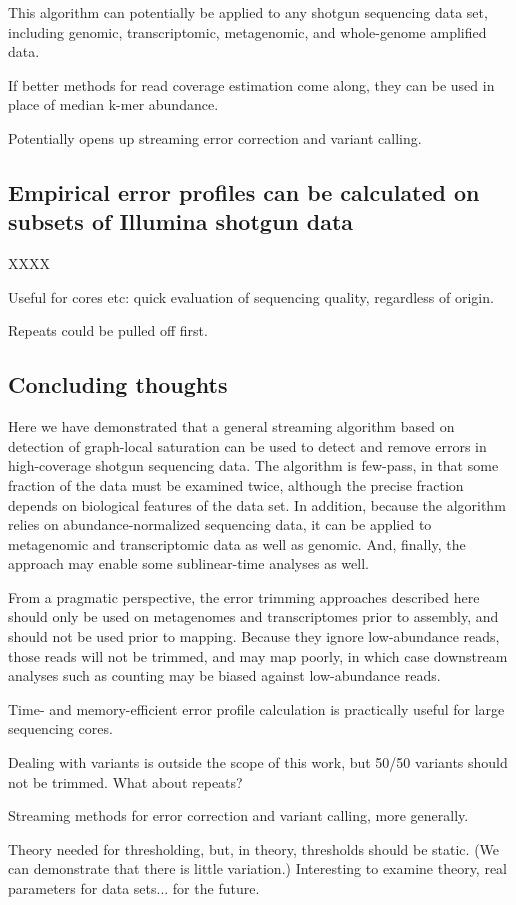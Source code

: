 \documentclass{article}
\begin{document}
This algorithm can potentially be applied to any shotgun sequencing
data set, including genomic, transcriptomic, metagenomic, and
whole-genome amplified data.

If better methods for read coverage estimation come along, they can be
used in place of median k-mer abundance.

Potentially opens up streaming error correction and variant calling.

\subsection{Empirical error profiles can be calculated on subsets of Illumina shotgun data}

XXXX

Useful for cores etc: quick evaluation of sequencing quality, regardless
of origin.

Repeats could be pulled off first.

\subsection{Concluding thoughts}

Here we have demonstrated that a general streaming algorithm based on
detection of graph-local saturation can be used to detect and remove
errors in high-coverage shotgun sequencing data.  The algorithm is
few-pass, in that some fraction of the data must be examined twice,
although the precise fraction depends on biological features of the
data set.  In addition, because the algorithm relies on
abundance-normalized sequencing data, it can be applied to metagenomic
and transcriptomic data as well as genomic.  And, finally, the approach
may enable some sublinear-time analyses as well.

From a pragmatic perspective, the error trimming approaches described
here should only be used on metagenomes and transcriptomes prior to
assembly, and should not be used prior to mapping.  Because they
ignore low-abundance reads, those reads will not be trimmed, and may
map poorly, in which case downstream analyses such as counting may be
biased against low-abundance reads.

Time- and memory-efficient error profile calculation is practically useful
for large sequencing cores.

Dealing with variants is outside the scope of this work, but 50/50
variants should not be trimmed.  What about repeats?

Streaming methods for error correction and variant calling, more generally.

Theory needed for thresholding, but, in theory, thresholds should be
static.  (We can demonstrate that there is little variation.)  Interesting
to examine theory, real parameters for data sets... for the future.
\end{document}
